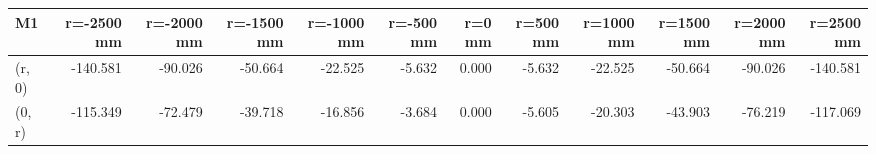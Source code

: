 \documentclass[convert={convertexe={magick.exe}}]{standalone}
\begin{document}
\begin{tabular}{lrrrrrrrrrrr}
\toprule
\bf{M1} &  r=-2500 mm &  r=-2000 mm &  r=-1500 mm &  r=-1000 mm &  r=-500 mm &  r=0 mm &  r=500 mm &  r=1000 mm &  r=1500 mm &  r=2000 mm &  r=2500 mm \\
\midrule
(r, 0) &    -140.581 &     -90.026 &     -50.664 &     -22.525 &     -5.632 &   0.000 &    -5.632 &    -22.525 &    -50.664 &    -90.026 &   -140.581 \\
(0, r) &    -115.349 &     -72.479 &     -39.718 &     -16.856 &     -3.684 &   0.000 &    -5.605 &    -20.303 &    -43.903 &    -76.219 &   -117.069 \\
\bottomrule
\end{tabular}
\end{document}
